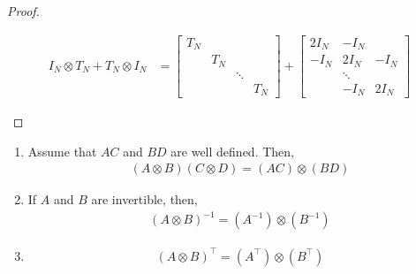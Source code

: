 \documentclass[11pt]{article}
\numberwithin{equation}{section}
\begin{document}
\begin{lemma}
\begin{proof}
\begin{enumerate}
\begin{align*}
                I_N \otimes T_N + T_N \otimes I_N &= \left[\begin{array}{llll}T_N & & & \\ & T_N &  & \\ & & \ddots & \\ & & & T_N\end{array}\right] + 
                \left[\begin{array}{ccc}2 I_{N} & -I_{N} & \\ -I_{N} & 2 I_{N} & -I_{N} \\ & \ddots & \\ & -I_{N} & 2 I_{N}\end{array}\right]
            \end{align*}
        \end{enumerate}
    \end{proof}
\end{lemma}

\begin{lemma}
    \begin{enumerate}
        \item Assume that $AC$ and $BD$ are well defined. Then,\begin{align*}
            (A \otimes B)(C \otimes D) = (AC) \otimes (BD)
        \end{align*}
        \item If $A$ and $B$ are invertible, then, \begin{align*}
            (A \otimes B)^{-1} = (A^{-1}) \otimes (B^{-1})
        \end{align*}
        \item \begin{align*}
            (A \otimes B)^{\top} = (A^{\top}) \otimes (B^{\top})
        \end{align*}
    \end{enumerate}
\end{lemma}
\end{document}
